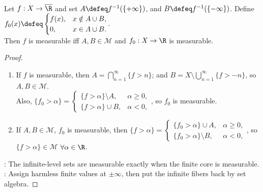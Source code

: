 \begin{lemma} \label{lem:extended-real-measurable-finite-part} \\
Let $f:X\to\overline{\R}$ and set $A\defeq f^{-1}(\{+\infty\})$, and $B\defeq f^{-1}(\{-\infty\})$.
Define $f_0(x)\defeq
\begin{cases}
f(x),&x\notin A\cup B,\\
0,&x\in A\cup B.
\end{cases}$.\\
Then $f$ is measurable iff $A,B\in\mathcal{M}$ and $f_0:X\to\R$ is measurable.
\begin{proof}
\begin{enumerate}[label=\roman*.]
\setlength{\itemsep}{0pt}
\item[$(\Rightarrow)$] If $f$ is measurable, then $A=\bigcap\limits_{n=1}^{\infty}\{f>n\}$; and $B=X\setminus\bigcup\limits_{n=1}^{\infty}\{f>-n\}$, so $A,B\in\mathcal{M}$.\\
Also, $\{f_0>\alpha\}=
\begin{cases}
\{f>\alpha\}\setminus A,&\alpha\geq0,\\
\{f>\alpha\}\cup B,&\alpha<0,
\end{cases}$, so $f_0$ is measurable.
\item[$(\Leftarrow)$] If $A,B\in\mathcal{M}$, $f_0$ is measurable, then $\{f>\alpha\}=
\begin{cases}
\{f_0>\alpha\}\cup A,&\alpha\geq0,\\
\{f_0>\alpha\}\setminus B,&\alpha<0,
\end{cases}$, so $\{f>\alpha\}\in\mathcal{M}$ $\forall \alpha\in\R$.
\end{enumerate}
: The infinite-level sets are measurable exactly when the finite core is measurable.\\
: Assign harmless finite values at $\pm\infty$, then put the infinite fibers back by set algebra.
\end{proof}
\end{lemma}

